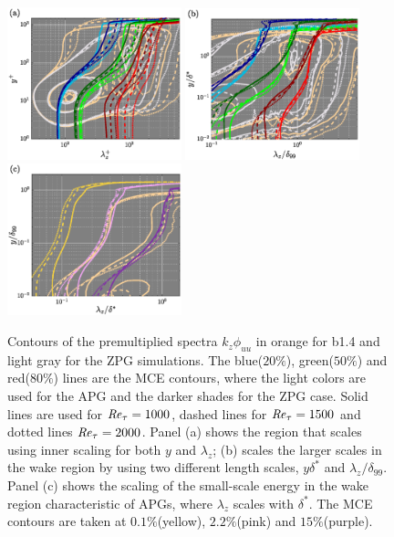 \begin{figure}[h!]
\centering
\includegraphics[width=0.45\textwidth]{imgs/spec/specMCE_uu_ltau_ltau.eps}
\includegraphics[width=0.45\textwidth]{imgs/spec/specMCE_uu_dstar_d99.eps}
\includegraphics[width=0.45\textwidth]{imgs/spec/specMCE_uu_d99_dstar.eps}
\caption{ \label{fig:MCE_spec}
Contours of the premultiplied spectra $k_z\phi_{uu}$ in orange for b1.4 and light gray for the ZPG simulations.
The blue($20\%$), green($50\%$) and red($80\%$) lines are the MCE contours, where the light colors are used for the APG and the darker shades for the ZPG case.
Solid lines are used for $\mbox{\textit{Re}}_{\tau}=1000$, dashed lines for $\mbox{\textit{Re}}_{\tau}=1500$ and dotted lines $\mbox{\textit{Re}}_{\tau}=2000$. Panel (a) shows the region that scales using inner scaling for both $y$ and $\lambda_z$; (b) scales the larger scales in the wake region by using two different length scales, $y\delta^*$ and $\lambda_z/\delta_{99}$. Panel (c) shows the scaling of the small-scale energy in the wake region characteristic of APGs, where $\lambda_z$ scales with $\delta^*$. The MCE contours are taken at $0.1\%$(yellow), $2.2\%$(pink) and  $15\%$(purple). 
}
\end{figure}






